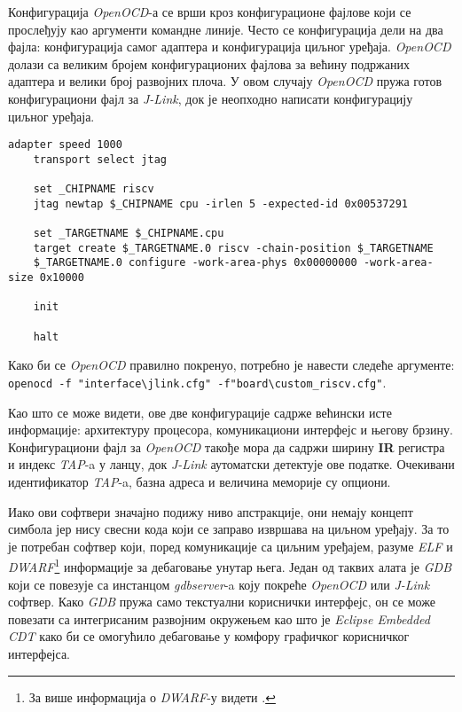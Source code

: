 Конфигурација \textit{Open\acrshort{OCD}}-а се врши кроз конфигурационе фајлове који се прослеђују као аргументи командне линије. Често се конфигурација дели на два фајла: конфигурација самог адаптера и конфигурација циљног уређаја. \textit{Open\acrshort{OCD}} 
долази са великим бројем конфигурационих фајлова за већину подржаних адаптера и велики број развојних плоча. У овом случају \textit{Open\acrshort{OCD}} пружа готов конфигурациони фајл за \textit{J-Link}, док је неопходно написати конфигурацију циљног уређаја.\newpage

\begin{lstlisting}[language=none,caption=Конфигурациони фајл циљног уређаја за \textit{Open\acrshort{OCD}} (\textbf{board\textbackslash{}custom\_riscv.cfg})]
	adapter speed 1000
	transport select jtag
	
	set _CHIPNAME riscv
	jtag newtap $_CHIPNAME cpu -irlen 5 -expected-id 0x00537291
	
	set _TARGETNAME $_CHIPNAME.cpu
	target create $_TARGETNAME.0 riscv -chain-position $_TARGETNAME
	$_TARGETNAME.0 configure -work-area-phys 0x00000000 -work-area-size 0x10000
	
	init
	
	halt
\end{lstlisting}

Како би се \textit{Open\acrshort{OCD}} правилно покренуо, потребно је навести следеће аргументе:\\ \lstinline[language=none,columns=fixed]{openocd -f "interface\jlink.cfg" -f"board\custom_riscv.cfg"}.

Као што се може видети, ове две конфигурације садрже већински исте информације: архитектуру процесора, комуникациони интерфејс и његову брзину. Конфигурациони фајл за \textit{Open\acrshort{OCD}} такође мора да садржи ширину \textbf{\acrshort{IR}} регистра и индекс \textit{\acrshort{TAP}}-a у ланцу, док \textit{J-Link} аутоматски детектује ове податке.
Очекивани идентификатор \textit{\acrshort{TAP}}-a, базна адреса и величина меморије су опциони.

Иако ови софтвери значајно подижу ниво апстракције, они немају концепт симбола јер нису свесни кода који се заправо извршава на циљном уређају. За то је потребан софтвер који, поред комуникације са циљним уређајем, разуме \textit{\acrfull{ELF}} и \textit{\acrshort{DWARF}}\footnote{За више информација о \textit{\acrshort{DWARF}}-у видети \cite{csned}.} информације за дебаговање унутар њега. Један од таквих алата је \textit{\acrshort{GDB}} који се повезује са инстанцом \textit{gdbserver}-a коју покреће \textit{Open\acrshort{OCD}} или \textit{J-Link} софтвер. Како \textit{\acrshort{GDB}} пружа само текстуални кориснички интерфејс, он се може повезати са интегрисаним развојним окружењем као што је \textit{Eclipse Embedded CDT} како би се омогућило дебаговање у комфору графичког корисничког интерфејса.

